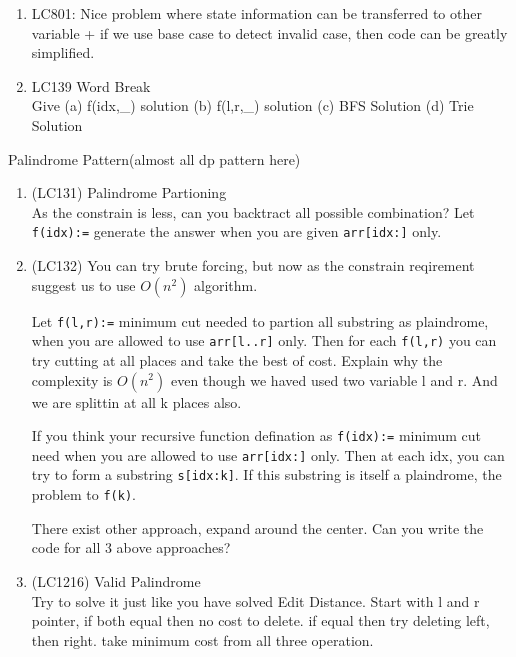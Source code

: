 \begin{exerciseHints}[Solutions/Comments:]
    \begin{enumerate}
        \item LC801: Nice problem where state information can be transferred to other variable + if we use base case to detect invalid case, then code can be greatly simplified.
        \item LC139 Word Break \\Give (a) f(idx,\_) solution (b) f(l,r,\_) solution (c) BFS Solution (d) Trie Solution
    \end{enumerate}

    { \Large Palindrome Pattern(almost all dp pattern here) \\}
    \begin{enumerate}
        \item (LC131) Palindrome Partioning \\As the constrain is less, can you backtract all possible combination? Let \verb|f(idx):=| generate the answer when you are given \verb|arr[idx:]| only.
        
        \item (LC132) You can try brute forcing, but now as the constrain reqirement suggest us to use $O(n^2)$ algorithm.
        
        Let \verb|f(l,r):=| minimum cut needed to partion all substring as plaindrome, when you are allowed to use \verb|arr[l..r]| only. Then for each \verb|f(l,r)| you can try cutting at all places and take the best of cost.
        Explain why the complexity is $O(n^2)$ even though we haved used two variable l and r. And we are splittin at all k places also.
        
        If you think your recursive function defination as \verb|f(idx):=| minimum cut need when you are allowed to use \verb|arr[idx:]| only. Then at each idx, you can try to form a substring \verb|s[idx:k]|. If this substring is itself a plaindrome, the problem to \verb|f(k)|.

        There exist other approach, expand around the center. Can you write the code for all 3 above approaches?

        \item (LC1216) Valid Palindrome\\ Try to solve it just like you have solved Edit Distance. Start with l and r pointer, if both equal then no cost to delete. if equal then try deleting left, then right.
        take minimum cost from all three operation.


\end{enumerate}
\end{exerciseHints}
